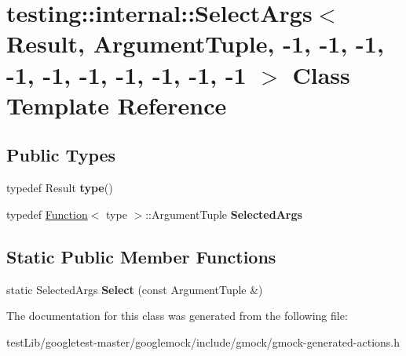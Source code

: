 \hypertarget{classtesting_1_1internal_1_1SelectArgs_3_01Result_00_01ArgumentTuple_00_01-1_00_01-1_00_01-1_00_d26521468f85209f6b4c61eca65baf5d}{}\section{testing\+:\+:internal\+:\+:Select\+Args$<$ Result, Argument\+Tuple, -\/1, -\/1, -\/1, -\/1, -\/1, -\/1, -\/1, -\/1, -\/1, -\/1 $>$ Class Template Reference}
\label{classtesting_1_1internal_1_1SelectArgs_3_01Result_00_01ArgumentTuple_00_01-1_00_01-1_00_01-1_00_d26521468f85209f6b4c61eca65baf5d}
\subsection*{Public Types}
\begin{DoxyCompactItemize}
\item 
\mbox{\label{classtesting_1_1internal_1_1SelectArgs_3_01Result_00_01ArgumentTuple_00_01-1_00_01-1_00_01-1_00_d26521468f85209f6b4c61eca65baf5d_a1630336a54c2407c1046bd1158a19569}} 
typedef Result {\bfseries type}()
\item 
\mbox{\label{classtesting_1_1internal_1_1SelectArgs_3_01Result_00_01ArgumentTuple_00_01-1_00_01-1_00_01-1_00_d26521468f85209f6b4c61eca65baf5d_a51990aecfbd69bd557cabd6798fae384}} 
typedef \hyperlink{structtesting_1_1internal_1_1Function}{Function}$<$ type $>$\+::Argument\+Tuple {\bfseries Selected\+Args}
\end{DoxyCompactItemize}
\subsection*{Static Public Member Functions}
\begin{DoxyCompactItemize}
\item 
\mbox{\label{classtesting_1_1internal_1_1SelectArgs_3_01Result_00_01ArgumentTuple_00_01-1_00_01-1_00_01-1_00_d26521468f85209f6b4c61eca65baf5d_a3006d06399412a67f576dca100f3a830}} 
static Selected\+Args {\bfseries Select} (const Argument\+Tuple \&)
\end{DoxyCompactItemize}


The documentation for this class was generated from the following file\+:\begin{DoxyCompactItemize}
\item 
test\+Lib/googletest-\/master/googlemock/include/gmock/gmock-\/generated-\/actions.\+h\end{DoxyCompactItemize}
